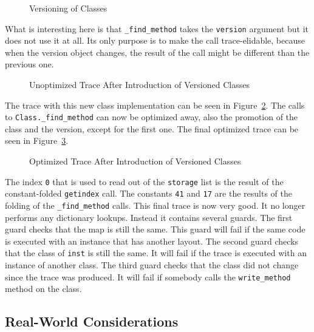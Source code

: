 \documentclass[preprint]{sigplanconf}
\begin{document}
\begin{figure}

\caption{Versioning of Classes}
\label{fig:version}
\end{figure}

What is interesting here is that \texttt{\_find\_method} takes the \texttt{version}
argument but it does not use it at all. Its only purpose is to make the call
trace-elidable, because when the version object changes, the result of the call might be
different than the previous one.

\begin{figure}

\caption{Unoptimized Trace After Introduction of Versioned Classes}
\label{fig:trace4}
\end{figure}

The trace with this new class implementation can be seen in
Figure~\ref{fig:trace4}.
The calls to \texttt{Class.\_find\_method} can now be optimized away, also the
promotion of the class and the version, except for the first one. The final
optimized trace can be seen in Figure~\ref{fig:trace5}.

\begin{figure}

\caption{Optimized Trace After Introduction of Versioned Classes}
\label{fig:trace5}
\end{figure}

The index \texttt{0} that is used to read out of the \texttt{storage} list is the result
of the constant-folded \texttt{getindex} call.
The constants \texttt{41} and \texttt{17} are the results of the folding of the
\texttt{\_find\_method} calls. This final trace is now very good. It no longer performs any
dictionary lookups. Instead it contains several guards. The first guard
checks that the map is still the same. This guard will fail if the same
code is executed with an instance that has another layout. The second guard
checks that the class of \texttt{inst} is still the same. It will fail if the trace is
executed with an instance of another class. The third guard checks that the
class did not change since the trace was produced. It will fail if somebody
calls the \texttt{write\_method} method on the class.


\subsection{Real-World Considerations}
\end{document}
